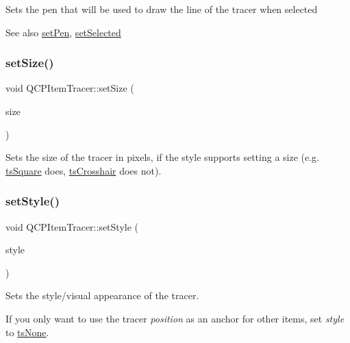 Sets the pen that will be used to draw the line of the tracer when selected

\begin{DoxySeeAlso}{See also}
\mbox{\hyperlink{class_q_c_p_item_tracer_af8048636fc1ef0152e51809b008df2ca}{set\+Pen}}, \mbox{\hyperlink{class_q_c_p_abstract_item_a203de94ad586cc44d16c9565f49d3378}{set\+Selected}} 
\end{DoxySeeAlso}
\mbox{\label{class_q_c_p_item_tracer_ae47fe0617f5fef5fdb766999569be10a}} 
\subsubsection{\texorpdfstring{setSize()}{setSize()}}
{\footnotesize\ttfamily void Q\+C\+P\+Item\+Tracer\+::set\+Size (\begin{DoxyParamCaption}\item[{double}]{size }\end{DoxyParamCaption})}

Sets the size of the tracer in pixels, if the style supports setting a size (e.\+g. \mbox{\hyperlink{class_q_c_p_item_tracer_a2f05ddb13978036f902ca3ab47076500a4ed5f01f2c5fd86d980366d79f481b9b}{ts\+Square}} does, \mbox{\hyperlink{class_q_c_p_item_tracer_a2f05ddb13978036f902ca3ab47076500af562ec81ac3ba99e26ef8540cf1ec16f}{ts\+Crosshair}} does not). \mbox{\label{class_q_c_p_item_tracer_a41a2ac4f1acd7897b4e2a2579c03204e}} 
\subsubsection{\texorpdfstring{setStyle()}{setStyle()}}
{\footnotesize\ttfamily void Q\+C\+P\+Item\+Tracer\+::set\+Style (\begin{DoxyParamCaption}\item[{\mbox{\hyperlink{class_q_c_p_item_tracer_a2f05ddb13978036f902ca3ab47076500}{Q\+C\+P\+Item\+Tracer\+::\+Tracer\+Style}}}]{style }\end{DoxyParamCaption})}

Sets the style/visual appearance of the tracer.

If you only want to use the tracer {\itshape position} as an anchor for other items, set {\itshape style} to \mbox{\hyperlink{class_q_c_p_item_tracer_a2f05ddb13978036f902ca3ab47076500aac27462c79146225bfa8fba24d2ee8a4}{ts\+None}}. \mbox{\label{class_q_c_p_item_tracer_a4e42d7b49f293273a74a49a2457856e2}} 
